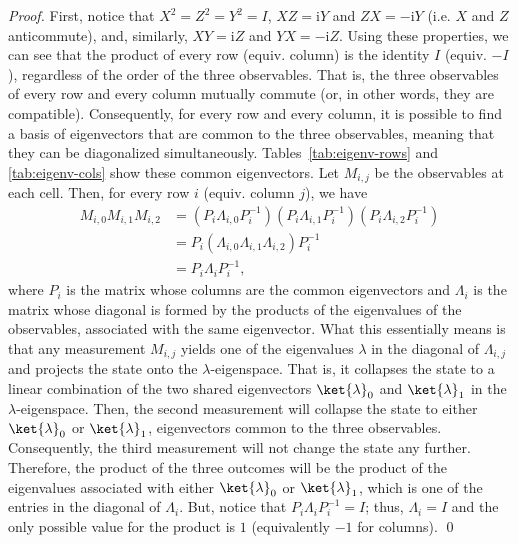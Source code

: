 \documentclass{llncs}
\newcommand{\ci}{\mathrm{i}}
\begin{document}
\begin{proof}
  \label{proof:product}
  First, notice that \(X^{2} = Z^{2} = Y^{2} = I\), \(XZ = \ci{}Y\)
  and \(ZX = -\ci{}Y\) (i.e. \(X\) and \(Z\) anticommute), and,
  similarly, \(XY = \ci{}Z\) and \(YX = -\ci{}Z\). Using these
  properties, we can see that the product of every row (equiv. column)
  is the identity \(I\) (equiv. \(-I\)), regardless of the order of
  the three observables.  That is, the three observables of every row
  and every column mutually commute (or, in other words, they are
  compatible).  Consequently, for every row and every column, it is
  possible to find a basis of eigenvectors that are common to the
  three observables, meaning that they can be diagonalized
  simultaneously. Tables~\ref{tab:eigenv-rows} and \ref{tab:eigenv-cols} show
  these common eigenvectors. Let \(M_{i, j}\) be the observables at
  each cell.  Then, for every row \(i\) (equiv. column \(j\)), we have
  \begin{align}
    M_{i, 0} M_{i, 1} M_{i, 2}
    &= (P_{i} \Lambda_{i, 0} P_{i}^{-1}) (P_{i}\Lambda_{i, 1}P_{i}^{-1}) (P_{i}\Lambda_{i, 2}P_{i}^{-1})
      \nonumber \\
    &= P_{i}(\Lambda_{i, 0} \Lambda_{i, 1} \Lambda_{i, 2})P_{i}^{-1} \nonumber \\
    &= P_{i}\Lambda_{i}P_{i}^{-1},
  \end{align}
  where \(P_{i}\) is the matrix whose columns are the common
  eigenvectors and \(\Lambda_{i}\) is the matrix whose diagonal is
  formed by the products of the eigenvalues of the observables,
  associated with the same eigenvector. What this essentially means is
  that any measurement \(M_{i, j}\) yields one of the eigenvalues
  \(\lambda\) in the diagonal of \(\Lambda_{i, j}\) and projects the
  state onto the \(\lambda\)-eigenspace. That is, it collapses the
  state to a linear combination of the two shared eigenvectors
  \(\ket{\lambda}_{0}\) and \(\ket{\lambda}_{1}\) in the
  \(\lambda\)-eigenspace. Then, the second measurement will collapse
  the state to either \(\ket{\lambda}_{0}\) or \(\ket{\lambda}_{1}\),
  eigenvectors common to the three observables.  Consequently, the
  third measurement will not change the state any further. Therefore,
  the product of the three outcomes will be the product of the
  eigenvalues associated with either \(\ket{\lambda}_{0}\) or
  \(\ket{\lambda}_{1}\), which is one of the entries in the diagonal
  of \(\Lambda_{i}\). But, notice that
  \(P_{i}\Lambda_{i}P_{i}^{-1} = I\); thus, \(\Lambda_{i} = I\) and
  the only possible value for the product is \(1\) (equivalently
  \(-1\) for columns). \qed
\end{proof}
\end{document}
